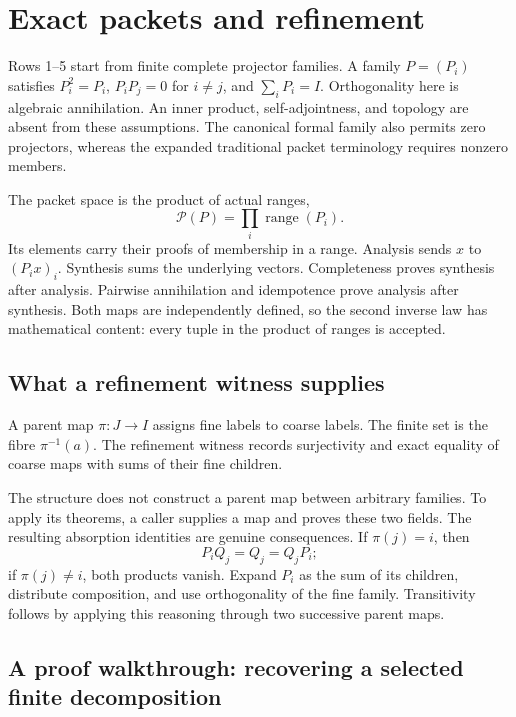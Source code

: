 \section{Exact packets and refinement}\label{sec:refinement}

Rows 1--5 start from finite complete projector families. A family $P=(P_i)$ satisfies $P_i^2=P_i$, $P_iP_j=0$ for $i\ne j$, and $\sum_iP_i=I$. Orthogonality here is algebraic annihilation. An inner product, self-adjointness, and topology are absent from these assumptions. The canonical formal family also permits zero projectors, whereas the expanded traditional packet terminology requires nonzero members.

The packet space is the product of actual ranges,
\[
\mathcal P(P)=\prod_i\operatorname{range}(P_i).
\]
Its elements carry their proofs of membership in a range. Analysis sends $x$ to $(P_i x)_i$. Synthesis sums the underlying vectors. Completeness proves synthesis after analysis. Pairwise annihilation and idempotence prove analysis after synthesis. Both maps are independently defined, so the second inverse law has mathematical content: every tuple in the product of ranges is accepted.

\subsection{What a refinement witness supplies}

A parent map $\pi:J\to I$ assigns fine labels to coarse labels. The finite set  is the fibre $\pi^{-1}(a)$. The refinement witness records surjectivity and exact equality of coarse maps with sums of their fine children.

The structure does not construct a parent map between arbitrary families. To apply its theorems, a caller supplies a map and proves these two fields. The resulting absorption identities are genuine consequences. If $\pi(j)=i$, then
\[
P_iQ_j=Q_j=Q_jP_i;
\]
if $\pi(j)\ne i$, both products vanish. Expand $P_i$ as the sum of its children, distribute composition, and use orthogonality of the fine family. Transitivity follows by applying this reasoning through two successive parent maps.

\subsection{A proof walkthrough: recovering a selected finite decomposition}


